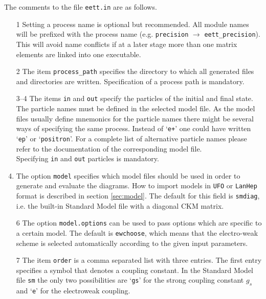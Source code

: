 \documentclass[11pt,a4paper]{refrep}
\begin{document}
The comments to the file {\tt eett.in} are as follows. 

\begin{enumerate}
\item[1] Setting a process name is optional but recommended. All module
names will be prefixed with the  process name (e.g. \texttt{precision}
$\to$ \texttt{eett\_precision}). This will avoid name conflicts if at
a later stage more than one matrix elements are linked into one
executable.
\item[2] The item \texttt{process\_path} specifies the directory
to which all generated files and directories are written.
Specification of a process path is mandatory.
\item[3--4] The items \texttt{in} and \texttt{out} specify the particles
of the initial and final state. The particle names must be defined in the
selected model file. As the model files usually define mnemonics for the
particle names there might be several ways of specifying the same process.
Instead of `\lstinline[basicstyle=\ttfamily]{e+}'
one could have written `\lstinline[basicstyle=\ttfamily]{ep}'
or `\lstinline[basicstyle=\ttfamily]{positron}'.
For a complete list of
alternative particle names please refer to the documentation of the
corresponding model file.
\\Specifying \texttt{in} and \texttt{out} particles is mandatory.
\item[5] The option \texttt{model} specifies which model files should
be used in order to generate and evaluate the diagrams. 
How to import models in {\tt UFO} or {\tt LanHep} format is described in 
section \ref{sec:model}.
The default for this field is {\tt smdiag}, i.e. the built-in Standard Model file
with a diagonal CKM matrix.
\item[6] The option \texttt{model.options} can be used to pass options 
which are specific to a certain model. The default is {\tt ewchoose}, 
which means that the electro-weak scheme is selected automatically according to the 
given input parameters.
\item[7] The item \texttt{order} is a comma separated list with
three entries. The first entry specifies a symbol that denotes a coupling
constant. In the Standard Model file \texttt{sm} the only two possibilities
are `\lstinline[basicstyle=\ttfamily]{gs}' for the strong coupling constant
$g_s$ and `\lstinline[basicstyle=\ttfamily]{e}' for the electroweak coupling.

\end{enumerate}
\end{document}
